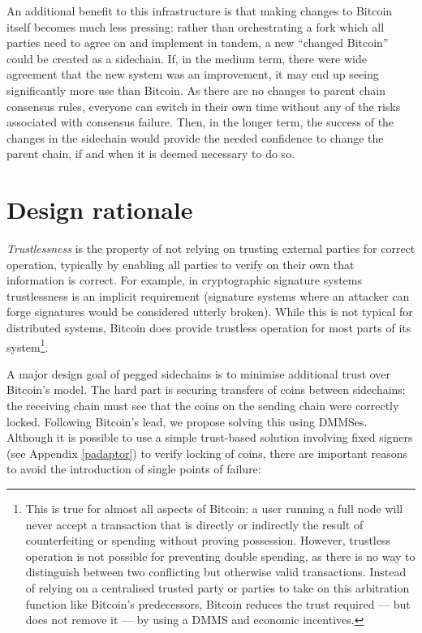 \documentclass[letterpaper]{article}
\newcommand{\mainchain}{parent chain\xspace}
\newcommand{\sidechain}{sidechain\xspace}
\newcommand{\sidechains}{sidechains\xspace}
\newcommand{\peggedsidechains}{pegged sidechains\xspace}
\newcommand{\hashsig}{DMMS\xspace}
\newcommand{\hashsigs}{DMMSes\xspace}
\begin{document}
An additional benefit to this infrastructure is that making changes to Bitcoin itself
becomes much less pressing: rather than orchestrating a fork which all parties
need to agree on and implement in tandem, a new ``changed Bitcoin''
could be created as a \sidechain. If, in the medium term, there were wide agreement
that the new system was an improvement, it may end up seeing significantly more use than Bitcoin. As there are no
changes to \mainchain consensus rules, everyone can switch in their own time without
any of the risks associated with consensus failure. Then, in the longer term,
the success of the changes in the \sidechain would provide the needed confidence
to change the \mainchain, if and when it is deemed necessary to do so.

\section{Design rationale}

\emph{Trustlessness} is the property of not relying on
trusting external parties for correct operation, typically by enabling all
parties to verify on their own that information is correct. For example,
in cryptographic signature systems trustlessness is an implicit requirement
(signature systems where an attacker can forge signatures would be
considered utterly broken). While this is not typical for distributed
systems, Bitcoin does provide trustless operation for most parts of its system\footnote{This
is true for almost all aspects of Bitcoin: a user running a full node will
never accept a transaction that is directly or indirectly the result of
counterfeiting or spending without proving possession. However, trustless
operation is not possible for preventing double spending, as there is no
way to distinguish between two conflicting but otherwise valid transactions.
Instead of relying on a centralised trusted party or parties to take on
this arbitration function like Bitcoin's predecessors, Bitcoin reduces
the trust required --- but does not remove it --- by using a \hashsig
and economic incentives.}.

A major design goal of \peggedsidechains is to minimise additional trust over Bitcoin's model. The hard part is securing transfers of coins between \sidechains: the receiving chain must see that the coins on the sending chain were correctly locked. Following Bitcoin's lead, we propose solving this using \hashsigs. Although it is possible to use a simple trust-based solution involving fixed signers (see Appendix \ref{padaptor}) to verify locking of coins, there are important reasons to avoid the introduction of single points of failure:
\end{document}
